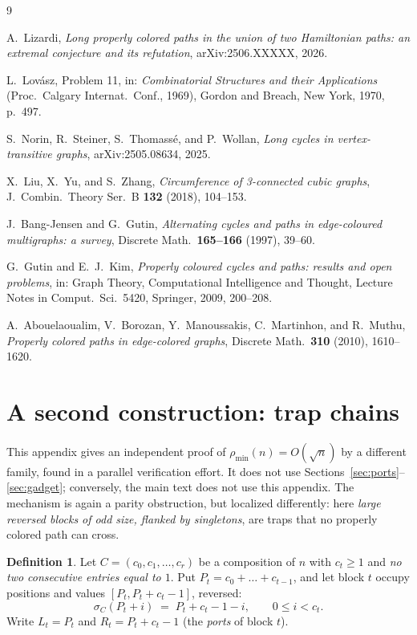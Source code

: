 \documentclass[11pt]{article}
\theoremstyle{definition}
\newtheorem{definition}[theorem]{Definition}
\newcommand{\pmin}{\rho_{\min}}
\begin{document}
\begin{thebibliography}{9}

A.~Lizardi,
\emph{Long properly colored paths in the union of two Hamiltonian paths: an
extremal conjecture and its refutation},
arXiv:2506.XXXXX, 2026.

L.~Lov\'asz,
Problem 11, in:
\emph{Combinatorial Structures and their Applications}
(Proc.\ Calgary Internat.\ Conf., 1969),
Gordon and Breach, New York, 1970, p.~497.

S.~Norin, R.~Steiner, S.~Thomass\'e, and P.~Wollan,
\emph{Long cycles in vertex-transitive graphs},
arXiv:2505.08634, 2025.

X.~Liu, X.~Yu, and S.~Zhang,
\emph{Circumference of 3-connected cubic graphs},
J.~Combin.\ Theory Ser.~B \textbf{132} (2018), 104--153.

J.~Bang-Jensen and G.~Gutin,
\emph{Alternating cycles and paths in edge-coloured multigraphs: a survey},
Discrete Math.\ \textbf{165--166} (1997), 39--60.

G.~Gutin and E.~J.~Kim,
\emph{Properly coloured cycles and paths: results and open problems},
in: Graph Theory, Computational Intelligence and Thought,
Lecture Notes in Comput.\ Sci.\ 5420, Springer, 2009, 200--208.

A.~Abouelaoualim, V.~Borozan, Y.~Manoussakis, C.~Martinhon, and R.~Muthu,
\emph{Properly colored paths in edge-colored graphs},
Discrete Math.\ \textbf{310} (2010), 1610--1620.

\end{thebibliography}

\appendix

\section{A second construction: trap chains}\label{app:trap}

This appendix gives an independent proof of $\pmin(n) = O(\sqrt n)$ by a different
family, found in a parallel verification effort. It does not use
Sections~\ref{sec:ports}--\ref{sec:gadget}; conversely, the main text does not use
this appendix. The mechanism is again a parity obstruction, but localized
differently: here \emph{large reversed blocks of odd size, flanked by singletons},
are traps that no properly colored path can cross.

\begin{definition}\label{def:chain}
Let $C = (c_0, c_1, \dots, c_r)$ be a composition of $n$ with $c_t \ge 1$ and
\emph{no two consecutive entries equal to $1$}. Put $P_t = c_0 + \dots + c_{t-1}$,
and let block $t$ occupy positions and values $[P_t, P_t + c_t - 1]$, reversed:
\[
\sigma_C(P_t + i) \;=\; P_t + c_t - 1 - i, \qquad 0 \le i < c_t .
\]
Write $L_t = P_t$ and $R_t = P_t + c_t - 1$ (the \emph{ports} of block $t$).
\end{definition}
\end{document}
